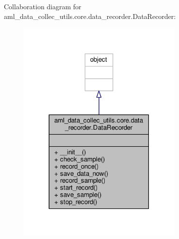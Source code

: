 Collaboration diagram for aml\-\_\-data\-\_\-collec\-\_\-utils.\-core.\-data\-\_\-recorder.\-Data\-Recorder\-:
\nopagebreak
\begin{figure}[H]
\begin{center}
\leavevmode
\includegraphics[width=234pt]{classaml__data__collec__utils_1_1core_1_1data__recorder_1_1_data_recorder__coll__graph}
\end{center}
\end{figure}
